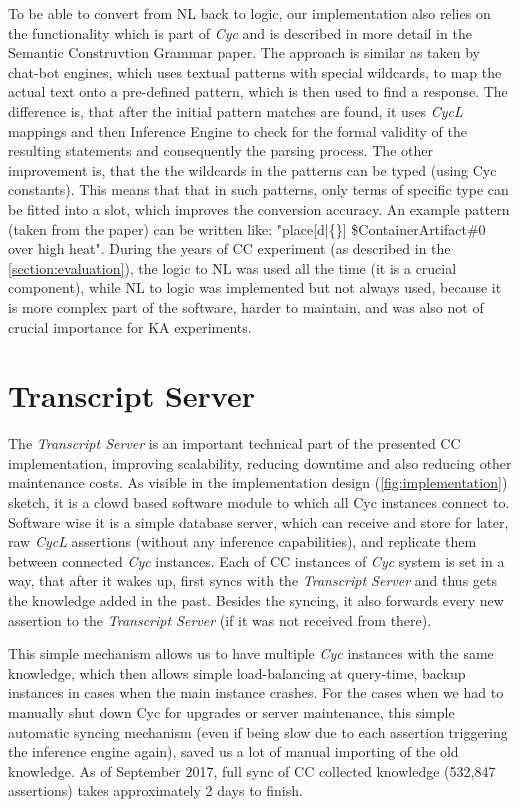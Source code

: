 To be able to convert from NL back to logic, our implementation also relies on
the functionality which is part of \emph{Cyc} and is described in more detail
in the Semantic Construvtion Grammar paper\parencite{Schneider2015}. The 
approach is similar as
taken by chat-bot engines\parencite{Wilcox2011}, which uses textual patterns
with special wildcards, to map the actual text onto a pre-defined pattern, which
is then used to find a response. The difference is, that after the initial 
pattern matches are found, it uses \emph{CycL} mappings and then Inference 
Engine to check for
the formal validity of the resulting statements and consequently the parsing 
process. The other improvement is, that the the wildcards in the patterns
can be typed (using Cyc constants). This means that that in such patterns, 
only terms of specific type can be fitted into a slot, which improves the 
conversion accuracy. An example pattern (taken from the paper) can be written 
like: "place[d|\{\}] \$ContainerArtifact\#0 over high heat".
During the years of CC experiment (as described in the 
\autoref{section:evaluation}), the logic to NL was used all the time (it is a
crucial component), while NL to logic was implemented but not always used, 
because it is more complex part of the software, harder to maintain, and was
also not of crucial importance for KA experiments.

\section{Transcript Server}
\label{section:transcriptserver}
The \emph{Transcript Server} is an important technical part of the presented CC 
implementation, improving scalability, reducing downtime and also reducing
other maintenance costs. As visible in the implementation design 
(\autoref{fig:implementation}) sketch, it is a clowd based software module
to which all Cyc instances connect to. Software wise it is a simple database
server, which can receive and store for later, raw \emph{CycL} assertions 
(without any inference capabilities), and replicate them between 
connected \emph{Cyc} instances. Each of CC instances of \emph{Cyc} system is
set in a way, that after it wakes up, first syncs with the \emph{Transcript 
Server} and thus gets the knowledge added in the past. Besides the syncing,
it also forwards every new assertion to the \emph{Transcript Server} (if it was
not received from there). 

This simple mechanism allows us to have multiple \emph{Cyc} instances with
the same knowledge, which then allows simple load-balancing at query-time,
backup instances in cases when the main instance crashes. For the cases when
we had to manually shut down Cyc for upgrades or server maintenance, this simple
automatic syncing mechanism (even if being slow due to each assertion triggering
the inference engine again), saved us a lot of manual importing of the old knowledge. As of September 2017, full sync of CC collected knowledge (532,847 
assertions) takes approximately 2 days to finish.

